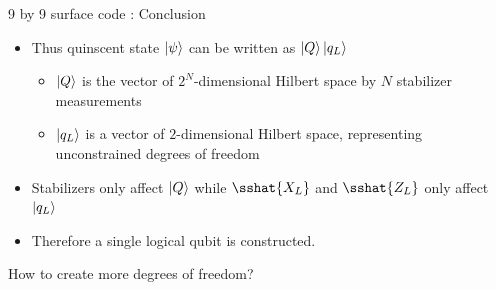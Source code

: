 \documentclass{beamer}
\begin{document}
    \begin{frame}{9 by 9 surface code : Conclusion}
        \begin{itemize}
            \item Thus quinscent state $ \ket{\psi} $ can be written as $ \ket{Q}\ket{q_L} $
            \begin{itemize}
                \item $ \ket{Q} $ is the vector of $ 2^N $-dimensional Hilbert space by $ N $ stabilizer measurements
                \item $ \ket{q_L} $ is a vector of $ 2 $-dimensional Hilbert space, representing unconstrained degrees of freedom
            \end{itemize}
            \item Stabilizers only affect $ \ket{Q} $ while $ \sshat{X_L} $ and $ \sshat{Z_L} $ only affect $ \ket{q_L} $
            \item Therefore a single logical qubit is constructed.
        \end{itemize}
        How to create more degrees of freedom?
    \end{frame}
    
\end{document}
